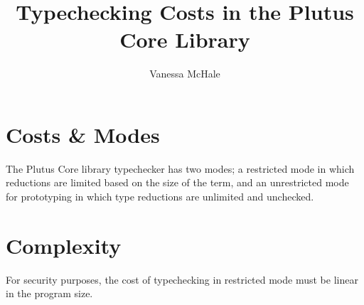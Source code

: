 \documentclass{article}
\begin{document}
\title{Typechecking Costs in the Plutus Core Library}
\author{Vanessa McHale}
\maketitle

\section{Costs \& Modes}

The Plutus Core library typechecker has two modes; a restricted mode in which
reductions are limited based on the size of the term, and an unrestricted mode
for prototyping in which type reductions are unlimited and unchecked.

\section{Complexity}

For security purposes, the cost of typechecking in restricted mode must
be linear in the program size.
\end{document}
